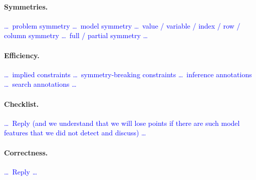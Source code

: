 \documentclass[a4paper,11pt,hidelinks]{article}
\renewcommand{\todo}[1]{\textcolor{blue}{#1}} %
\begin{document}
\paragraph{Symmetries.}
\todo{\dots\ problem symmetry \dots\ model symmetry \dots\ value /
  variable / index / row / column symmetry \dots\ full / partial
  symmetry \dots}

\paragraph{Efficiency.}
\todo{\dots\ implied constraints \dots\ symmetry-breaking constraints
  \dots\ inference annotations \dots\ search annotations \dots}

\paragraph{Checklist.}
\todo{\dots\ Reply (and we understand that we will lose points if
  there are such model features that we did not detect and discuss)
  \dots}

\paragraph{Correctness.}
\todo{\dots\ Reply \dots}
\end{document}
